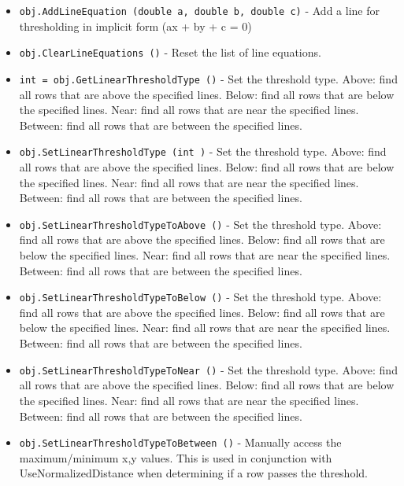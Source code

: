 \begin{itemize}
\item  \verb|obj.AddLineEquation (double a, double b, double c)| -  Add a line for thresholding in implicit form (ax + by + c = 0)

\item  \verb|obj.ClearLineEquations ()| -  Reset the list of line equations.

\item  \verb|int = obj.GetLinearThresholdType ()| -  Set the threshold type.  Above: find all rows that are above the specified
 lines.  Below: find all rows that are below the specified lines.  Near:
 find all rows that are near the specified lines.  Between: find all rows
 that are between the specified lines.

\item  \verb|obj.SetLinearThresholdType (int )| -  Set the threshold type.  Above: find all rows that are above the specified
 lines.  Below: find all rows that are below the specified lines.  Near:
 find all rows that are near the specified lines.  Between: find all rows
 that are between the specified lines.

\item  \verb|obj.SetLinearThresholdTypeToAbove ()| -  Set the threshold type.  Above: find all rows that are above the specified
 lines.  Below: find all rows that are below the specified lines.  Near:
 find all rows that are near the specified lines.  Between: find all rows
 that are between the specified lines.

\item  \verb|obj.SetLinearThresholdTypeToBelow ()| -  Set the threshold type.  Above: find all rows that are above the specified
 lines.  Below: find all rows that are below the specified lines.  Near:
 find all rows that are near the specified lines.  Between: find all rows
 that are between the specified lines.

\item  \verb|obj.SetLinearThresholdTypeToNear ()| -  Set the threshold type.  Above: find all rows that are above the specified
 lines.  Below: find all rows that are below the specified lines.  Near:
 find all rows that are near the specified lines.  Between: find all rows
 that are between the specified lines.

\item  \verb|obj.SetLinearThresholdTypeToBetween ()| -  Manually access the maximum/minimum x,y values.  This is used in 
 conjunction with UseNormalizedDistance when determining if a row
 passes the threshold.


\end{itemize}
